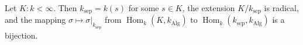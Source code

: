 Let $K:k < \infty$. Then $k_{\text{sep}} = k(s)$ for some $s \in K$, the extension $K/k_{\text{sep}}$ is radical, and the mapping $\sigma \mapsto \sigma|_{k_{\text{sep}}}$ from $\operatorname{Hom}_k(K, k_{\text{Alg}})$ to $\operatorname{Hom}_k(k_{\text{sep}}, k_{\text{Alg}})$ is a bijection.
